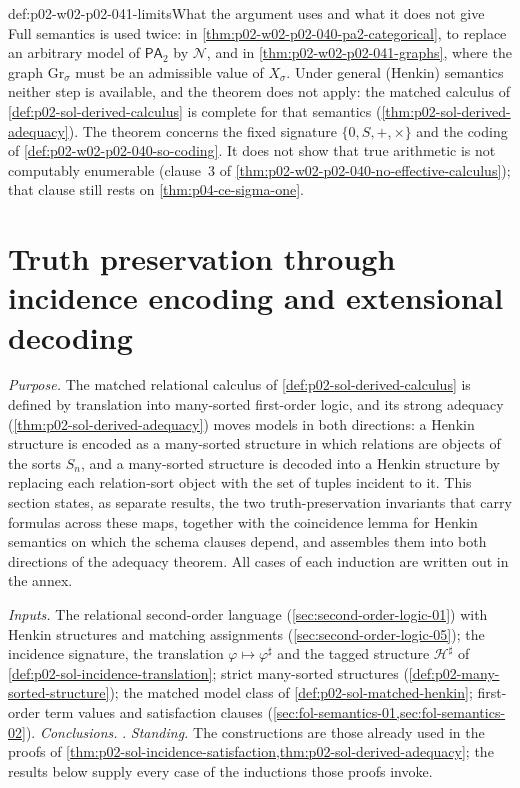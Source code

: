 \begin{hbwarning}{def:p02-w02-p02-041-limits}{What the argument uses and what it does not give}
Full semantics is used twice: in \cref{thm:p02-w02-p02-040-pa2-categorical}, to
replace an arbitrary model of \(\mathsf{PA}_2\) by \(\mathcal N\), and in
\cref{thm:p02-w02-p02-041-graphs}, where the graph \(\mathrm{Gr}_\sigma\) must
be an admissible value of \(X_\sigma\).  Under general (Henkin) semantics
neither step is available, and the theorem does not apply: the matched
calculus of \cref{def:p02-sol-derived-calculus} is complete for that
semantics (\cref{thm:p02-sol-derived-adequacy}).  The theorem concerns the
fixed signature \(\{0,S,+,\times\}\) and the coding of
\cref{def:p02-w02-p02-040-so-coding}.  It does not show that true
arithmetic is not computably enumerable (clause~3 of
\cref{thm:p02-w02-p02-040-no-effective-calculus}); that clause still rests on
\cref{thm:p04-ce-sigma-one}.
\end{hbwarning}

\section{Truth preservation through incidence encoding and extensional decoding}
\label{sec:p02-w02-p02-041-decoding}

\emph{Purpose.}  The matched relational calculus of
\cref{def:p02-sol-derived-calculus} is defined by translation into
many-sorted first-order logic, and its strong adequacy
(\cref{thm:p02-sol-derived-adequacy}) moves models in both directions: a
Henkin structure is encoded as a many-sorted structure in which relations are
objects of the sorts \(S_n\), and a many-sorted structure is decoded into a
Henkin structure by replacing each relation-sort object with the set of tuples
incident to it.  This section states, as separate results, the two
truth-preservation invariants that carry formulas across these maps, together
with the coincidence lemma for Henkin semantics on which the schema clauses
depend, and assembles them into both directions of the adequacy theorem.  All
cases of each induction are written out in the annex.

\emph{Inputs.}  The relational second-order language
(\cref{sec:second-order-logic-01}) with Henkin structures and matching
assignments (\cref{sec:second-order-logic-05}); the incidence signature, the
translation \(\varphi\mapsto\varphi^\sharp\) and the tagged structure
\(\mathcal H^\sharp\) of \cref{def:p02-sol-incidence-translation}; strict
many-sorted structures (\cref{def:p02-many-sorted-structure}); the matched
model class of \cref{def:p02-sol-matched-henkin}; first-order term values and
satisfaction clauses (\cref{sec:fol-semantics-01,sec:fol-semantics-02}).
\emph{Conclusions.}
.
\emph{Standing.}  The constructions are those already used in the proofs of
\cref{thm:p02-sol-incidence-satisfaction,thm:p02-sol-derived-adequacy}; the
results below supply every case of the inductions those proofs invoke.

